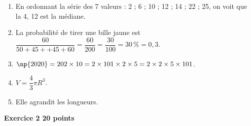 \documentclass[10pt]{article}
\begin{document}
\bigskip

\begin{enumerate}
\item En ordonnant la série des 7 valeurs : 2 ; 6 ; 10  ; 12 ; 14 ; 22 ; 25, on voit que la 4, 12 est la médiane.
\item La probabilité de tirer une bille jaune est $\dfrac{60}{50 + 45 + + 45 + 60} = \dfrac{60}{200} = \dfrac{30}{100} = 30\,\% = 0,3$.
\item $\np{2020} = 202 \times 10 = 2 \times 101 \times 2 \times 5 = 2 \times 2\times 5\times 101$.
\item $V = \dfrac{4}{3}\pi R^3$.
\item Elle agrandit les longueurs.
\end{enumerate}

\bigskip

\textbf{Exercice 2 \hfill 20 points}

\medskip
 
% 
%
%
%
%

\medskip
\end{document}
